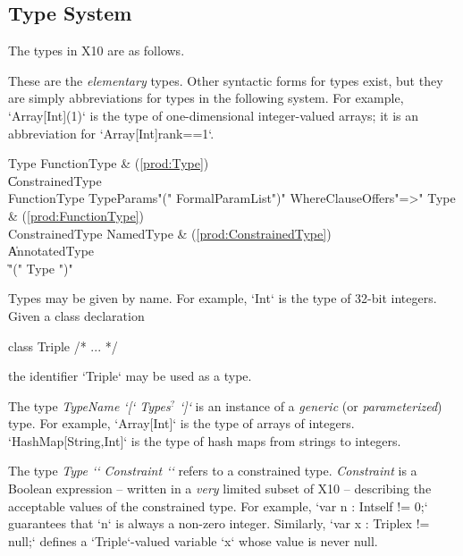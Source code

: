 \subsection{Type System}
The types in X10 are as follows.  

These are the {\em elementary} types. Other
syntactic forms for types exist, but they are simply abbreviations for types
in the following system.  For example, \xcd`Array[Int](1)` is the type of
one-dimensional integer-valued arrays; it is an abbreviation for
\xcd`Array[Int]{rank==1}`.\\


\begin{bbgrammar}
                Type \: FunctionType & (\ref{prod:Type}) \\
                    \| ConstrainedType \\
        FunctionType \: TypeParams\opt \xcd"(" FormalParamList\opt \xcd")" WhereClause\opt Offers\opt \xcd"=>" Type & (\ref{prod:FunctionType}) \\
     ConstrainedType \: NamedType & (\ref{prod:ConstrainedType}) \\
                    \| AnnotatedType \\
                    \| \xcd"(" Type \xcd")" \\
\end{bbgrammar}


Types may be given by name. 
For example, 
\xcd`Int`
is the type of 32-bit integers.
Given a class declaration 
\begin{xten}
class Triple { /* ... */ }
\end{xten}
%
the identifier \xcd`Triple` may be used as a type.

The type {\em TypeName \xcd`[` Types{$^?$} \xcd`]`} is an instance of
a {\em generic} (or {\em parameterized}) type. 
 For example,
\xcd`Array[Int]` is the type of arrays of integers. 
\xcd`HashMap[String,Int]` is the type of hash maps from strings to
integers.

The type {\em Type \xcd`{` Constraint \xcd`}`} refers to a constrained type.
{\em Constraint} is a Boolean expression -- written in a {\em very} limited
subset of X10 -- describing the acceptable values of the constrained type.
For example, \xcd`var n : Int{self != 0};` guarantees that \xcd`n` is always a
non-zero integer. 
Similarly, \xcd`var x : Triple{x != null};` defines a \xcd`Triple`-valued
variable \xcd`x` whose value is never null.

